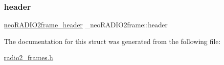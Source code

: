 \mbox{\label{struct__neo_r_a_d_i_o2frame_a6d951e42651eb3cbd60431447b42c105}} 
\subsubsection{\texorpdfstring{header}{header}}
{\footnotesize\ttfamily \mbox{\hyperlink{radio2__frames_8h_a8998eb6f57354dabd898b6089c2e6f87}{neo\+R\+A\+D\+I\+O2frame\+\_\+header}} \+\_\+neo\+R\+A\+D\+I\+O2frame\+::header}



The documentation for this struct was generated from the following file\+:\begin{DoxyCompactItemize}
\item 
\mbox{\hyperlink{radio2__frames_8h}{radio2\+\_\+frames.\+h}}\end{DoxyCompactItemize}
